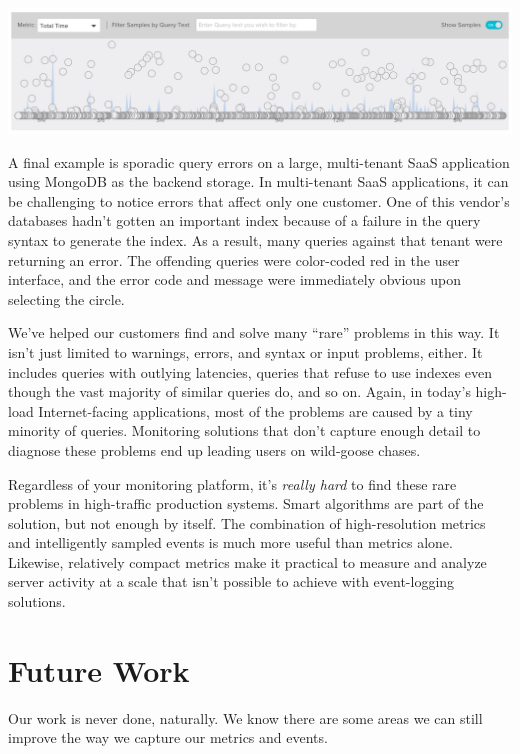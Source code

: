 \documentclass{vivid_layout}
\begin{document}
\begin{center}
\includegraphics[width=.85\linewidth]{sketch-sampling/distribution}
\end{center}

A final example is sporadic query errors on a large, multi-tenant SaaS
application using MongoDB as the backend storage. In multi-tenant SaaS
applications, it can be challenging to notice errors that affect only one
customer. One of this vendor's databases hadn't gotten an important index
because of a failure in the query syntax to generate the index.  As a result,
many queries against that tenant were returning an error. The offending queries
were color-coded red in the user interface, and the error code and message were
immediately obvious upon selecting the circle.

We've helped our customers find and solve many ``rare'' problems in this
way. It isn't just limited to warnings, errors, and syntax or input problems,
either. It includes queries with outlying latencies, queries that refuse to use
indexes even though the vast majority of similar queries do, and so on. Again,
in today's high-load Internet-facing applications, most of the problems are
caused by a tiny minority of queries. Monitoring solutions that don't capture
enough detail to diagnose these problems end up leading users on wild-goose
chases.

Regardless of your monitoring platform, it's \emph{really hard} to find these
rare problems in high-traffic production systems. Smart algorithms are part of
the solution, but not enough by itself. The combination of high-resolution
metrics and intelligently sampled events is much more useful than metrics alone.
Likewise, relatively compact metrics make it practical to measure and analyze
server activity at a scale that isn't possible to achieve with event-logging
solutions.

\section{Future Work}

Our work is never done, naturally. We know there are some areas we can still
improve the way we capture our metrics and events.
\end{document}
